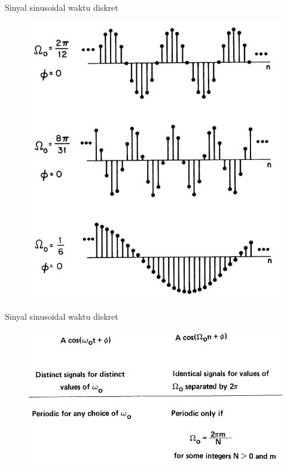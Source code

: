 \documentclass[pdflatex,compress,mathserif]{beamer}
\begin{document}
\begin{frame}{Sinyal sinusoidal waktu diskret}
	\begin{figure}
		\centering
		\includegraphics[height=0.8\textheight]{img/01.slide_11}
	\end{figure}
\end{frame}

\begin{frame}{Sinyal sinusoidal waktu diskret}
	\begin{figure}
		\centering
		\includegraphics[height=0.8\textheight]{img/01.slide_12}
	\end{figure}
\end{frame}
\end{document}
